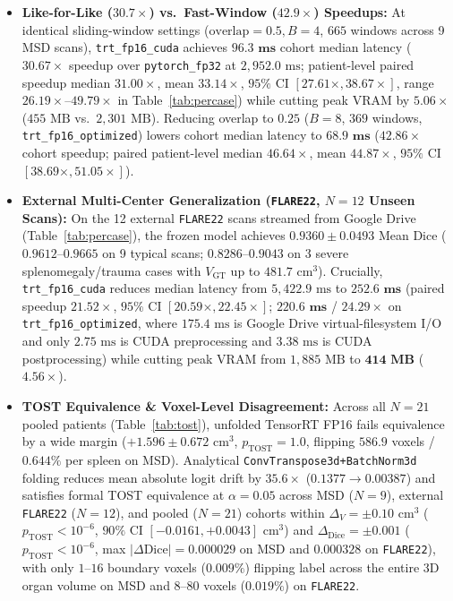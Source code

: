 \documentclass[10pt,twocolumn]{article}
\begin{document}
\begin{itemize}
    \item \textbf{Like-for-Like ($30.7\times$) vs.\ Fast-Window ($42.9\times$) Speedups:} At identical sliding-window settings ($\text{overlap}=0.5, B=4$, $665$ windows across 9 MSD scans), \texttt{trt\_fp16\_cuda} achieves $\mathbf{96.3\textbf{ ms}}$ cohort median latency ($\mathbf{30.67\times}$ speedup over \texttt{pytorch\_fp32} at $2,952.0\text{ ms}$; patient-level paired speedup median $\mathbf{31.00\times}$, mean $\mathbf{33.14\times}$, $95\%$ CI $[27.61\times, 38.67\times]$, range $26.19\times\text{--}49.79\times$ in Table~\ref{tab:percase}) while cutting peak VRAM by $\mathbf{5.06\times}$ ($455\text{ MB}$ vs.\ $2,301\text{ MB}$). Reducing overlap to $0.25$ ($B=8$, $369$ windows, \texttt{trt\_fp16\_optimized}) lowers cohort median latency to $\mathbf{68.9\textbf{ ms}}$ ($\mathbf{42.86\times}$ cohort speedup; paired patient-level median $\mathbf{46.64\times}$, mean $\mathbf{44.87\times}$, $95\%$ CI $[38.69\times, 51.05\times]$).
    \item \textbf{External Multi-Center Generalization (\texttt{FLARE22}, $N = 12$ Unseen Scans):} On the 12 external \texttt{FLARE22} scans streamed from Google Drive (Table~\ref{tab:percase}), the frozen model achieves $\mathbf{0.9360 \pm 0.0493}$ Mean Dice ($0.9612\text{--}0.9665$ on 9 typical scans; $0.8286\text{--}0.9043$ on 3 severe splenomegaly/trauma cases with $V_{\text{GT}}$ up to $481.7\text{ cm}^3$). Crucially, \texttt{trt\_fp16\_cuda} reduces median latency from $5,422.9\text{ ms}$ to $\mathbf{252.6\textbf{ ms}}$ (paired speedup $\mathbf{21.52\times}$, $95\%$ CI $[20.59\times, 22.45\times]$; $\mathbf{220.6\textbf{ ms}}$ / $\mathbf{24.29\times}$ on \texttt{trt\_fp16\_optimized}, where $175.4\text{ ms}$ is Google Drive virtual-filesystem I/O and only $2.75\text{ ms}$ is CUDA preprocessing and $3.38\text{ ms}$ is CUDA postprocessing) while cutting peak VRAM from $1,885\text{ MB}$ to $\mathbf{414\textbf{ MB}}$ ($\mathbf{4.56\times}$).
    \item \textbf{TOST Equivalence \& Voxel-Level Disagreement:} Across all $N = 21$ pooled patients (Table~\ref{tab:tost}), unfolded TensorRT FP16 fails equivalence by a wide margin ($+1.596 \pm 0.672\text{ cm}^3$, $p_{\text{TOST}} = 1.0$, flipping $586.9$ voxels / $0.644\%$ per spleen on MSD). Analytical \texttt{ConvTranspose3d+BatchNorm3d} folding reduces mean absolute logit drift by $35.6\times$ ($0.1377 \to 0.00387$) and satisfies formal TOST equivalence at $\alpha = 0.05$ across MSD ($N=9$), external \texttt{FLARE22} ($N=12$), and pooled ($N=21$) cohorts within $\Delta_V = \pm 0.10\text{ cm}^3$ ($p_{\text{TOST}} < 10^{-6}$, $90\%$ CI $[-0.0161, +0.0043]\text{ cm}^3$) and $\Delta_{\text{Dice}} = \pm 0.001$ ($p_{\text{TOST}} < 10^{-6}$, max $|\Delta\text{Dice}| = 0.000029$ on MSD and $0.000328$ on \texttt{FLARE22}), with only $1\text{--}16$ boundary voxels ($0.009\%$) flipping label across the entire 3D organ volume on MSD and $8\text{--}80$ voxels ($0.019\%$) on \texttt{FLARE22}.
\end{itemize}
\end{document}
